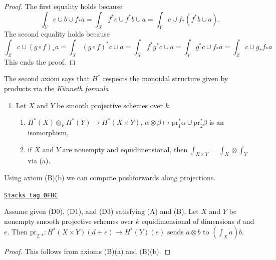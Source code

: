 \begin{proof}
The first equality holds because
$$
\int_Y c \cup b \cup f_*a =
\int_X f^*c \cup f^*b \cup a =
\int_Y c \cup f_*(f^*b \cup a).
$$
The second equality holds because
$$
\int_Z c \cup (g \circ f)_*a = \int_X (g \circ f)^*c \cup a =
\int_X f^* g^* c \cup a = \int_Y g^*c \cup f_*a = \int_Z c \cup g_*f_*a
$$
This ends the proof.
\end{proof}

The second axiom says that $H^*$ respects the monoidal structure
given by products via the {\it K\"unneth formula}
\begin{enumerate}
\item[(B)] Let $X$ and $Y$ be smooth projective schemes over $k$.
\begin{enumerate}
\item $H^*(X) \otimes_F H^*(Y) \to H^*(X \times Y)$,
$\alpha \otimes \beta \mapsto \text{pr}_1^*\alpha \cup \text{pr}_2^*\beta$
is an isomorphism,
\item if $X$ and $Y$ are nonempty and equidimensional, then
$\int_{X \times Y} = \int_X \otimes \int_Y$ via (a).
\end{enumerate}
\end{enumerate}
Using axiom (B)(b) we can compute pushforwards along projections.

\begin{lemma}[Pr2star]
\label{weil-lemma-pr2star}
\href{https://stacks.math.columbia.edu/tag/0FHC}{\texttt{Stacks tag 0FHC}}

Assume given (D0), (D1), and (D3) satisfying (A) and (B).
Let $X$ and $Y$ be nonempty smooth projective schemes over $k$
equidimensional of dimensions $d$ and $e$. Then
$\text{pr}_{2, *} : H^*(X \times Y)(d + e) \to H^*(Y)(e)$ sends
$a \otimes b$ to $(\int_X a) b$.
\end{lemma}

\begin{proof}
This follows from axioms (B)(a) and (B)(b).
\end{proof}

